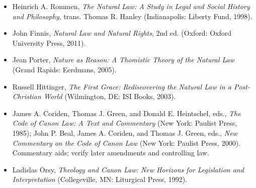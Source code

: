 \begin{itemize}
\item Heinrich A. Rommen, \emph{The Natural Law: A Study in Legal and Social History and Philosophy}, trans. Thomas R. Hanley (Indianapolis: Liberty Fund, 1998).
\item John Finnis, \emph{Natural Law and Natural Rights}, 2nd ed. (Oxford: Oxford University Press, 2011).
\item Jean Porter, \emph{Nature as Reason: A Thomistic Theory of the Natural Law} (Grand Rapids: Eerdmans, 2005).
\item Russell Hittinger, \emph{The First Grace: Rediscovering the Natural Law in a Post-Christian World} (Wilmington, DE: ISI Books, 2003).
\item James A. Coriden, Thomas J. Green, and Donald E. Heintschel, eds., \emph{The Code of Canon Law: A Text and Commentary} (New York: Paulist Press, 1985); John P. Beal, James A. Coriden, and Thomas J. Green, eds., \emph{New Commentary on the Code of Canon Law} (New York: Paulist Press, 2000). Commentary aids; verify later amendments and controlling law.
\item Ladislas Orsy, \emph{Theology and Canon Law: New Horizons for Legislation and Interpretation} (Collegeville, MN: Liturgical Press, 1992).
\end{itemize}
